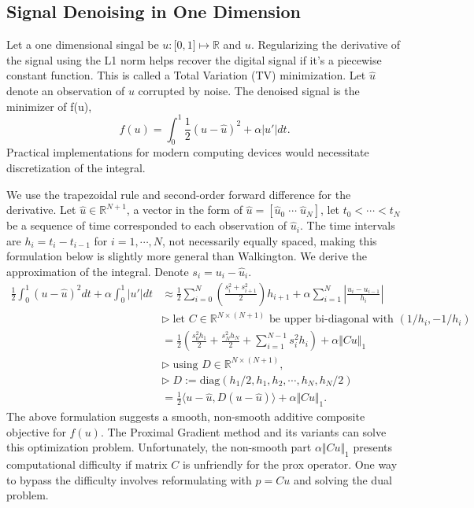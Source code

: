\documentclass[]{article}
\theoremstyle{definition}
\numberwithin{equation}{subsection}
\begin{document}
    \subsection{Signal Denoising in One Dimension}
        Let a one dimensional singal be $u: \mathbb [0, 1]\mapsto \mathbb R$ and $u$. 
        Regularizing the derivative of the signal using the L1 norm helps recover the digital signal if it's a piecewise constant function. 
        This is called a Total Variation (TV) minimization. 
        Let $\hat u$ denote an observation of $u$ corrupted by noise. 
        The denoised signal is the minimizer of f(u),
        \[
            f(u) = \int_0^1 \frac{1}{2} 
            (u - \hat u)^2 + \alpha |u'|dt. 
        \]
        Practical implementations for modern computing devices would necessitate discretization of the integral. 
        \par
        We use the trapezoidal rule and second-order forward difference for the derivative. 
        Let $\hat u \in \mathbb R^{N+1}$, a vector in the form of $\hat u = [\hat u_0\; \cdots \; \hat u_{N}]$, let $t_0<  \cdots <t_N$ be a sequence of time corresponded to each observation of $\hat u_i$. 
        The time intervals are $h_i = t_{i} - t_{i-1}$ for $i=1, \cdots, N$, not necessarily equally spaced, making this formulation below is slightly more general than Walkington\cite{noel_nesterovs_nodate}. 
        We derive the approximation of the integral. Denote $s_i = u_i - \hat u_i$. 
        \begin{align*}
            \frac{1}{2}\int_{0}^{1} (u - \hat u)^2 dt + 
            \alpha \int_0^1 |u'| dt
            &\approx
            \frac{1}{2}
            \sum_{i = 0}^{N}
            \left(
                \frac{s_i^2 + s_{i + 1}^2}{2}
            \right)h_{i + 1}
            + 
            \alpha
            \sum_{i = 1}^{N}
            \left|
                \frac{u_{i} - u_{i - 1}}{h_{i}}
            \right|
            \\
            & \triangleright\; \text{let } 
            C\in \mathbb R^{N\times (N + 1)} \text{ be upper bi-diagonal with }(1/h_i, -1/h_{i})
            \\
            &= \frac{1}{2}\left(
                \frac{s_0^2h_1}{2} + \frac{s_N^2h_N}{2}
                + 
                \sum_{i = 1}^{N - 1}s_i^2 h_i
            \right) + \alpha\Vert Cu\Vert_1
            \\
            & 
            \triangleright \; \text{using } D\in \mathbb R^{N \times (N + 1)},
            \\
            & \triangleright\; D := \text{diag}(h_1/2, h_1, h_2, \cdots, h_N, h_N/2)
            \\
            &= 
            \frac{1}{2}\langle u - \hat u, D(u - \hat u)\rangle + \alpha \Vert Cu\Vert_1. 
        \end{align*}
    The above formulation suggests a smooth, non-smooth additive composite objective for $f(u)$. 
    The Proximal Gradient method and its variants can solve this optimization problem. 
    Unfortunately, the non-smooth part $\alpha\Vert Cu\Vert_1$ presents computational difficulty if matrix $C$ is unfriendly for the prox operator. 
    One way to bypass the difficulty involves reformulating with $p = Cu$ and solving the dual problem. 
\end{document}
